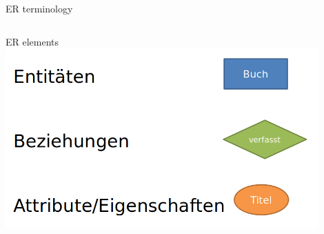 \begin{frame}{ER terminology~\parencite[9--12]{chen1976}}
\begin{columns}[T,onlytextwidth]
      \begin{block}{ER elements}
      \includegraphics[width=0.9\textwidth]{img/er-bsp2.png}
      \end{block}
  \end{columns}

\end{frame}

